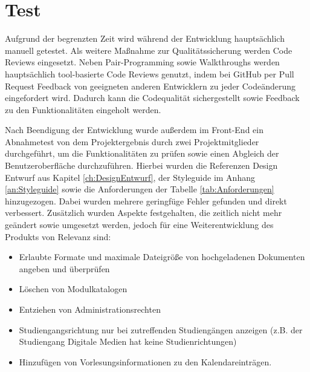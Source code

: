 \section{Test}
Aufgrund der begrenzten Zeit wird während der Entwicklung hauptsächlich manuell getestet. 
Als weitere Maßnahme zur Qualitätssicherung werden Code Reviews eingesetzt.
Neben Pair-Programming sowie Walkthroughs werden hauptsächlich tool-basierte Code Reviews genutzt, indem bei GitHub per Pull Request Feedback von geeigneten anderen Entwicklern zu jeder Codeänderung eingefordert wird.
Dadurch kann die Codequalität sichergestellt sowie Feedback zu den Funktionalitäten eingeholt werden.

Nach Beendigung der Entwicklung wurde außerdem im Front-End ein Abnahmetest von dem Projektergebnis durch zwei Projektmitglieder durchgeführt, um die Funktionalitäten zu prüfen sowie einen Abgleich der Benutzeroberfläche durchzuführen. 
Hierbei wurden die Referenzen Design Entwurf aus Kapitel \vref{ch:DesignEntwurf}, der Styleguide im Anhang \vref{an:Styleguide} sowie die Anforderungen der Tabelle \vref{tab:Anforderungen} hinzugezogen.
Dabei wurden mehrere geringfüge Fehler gefunden und direkt verbessert.
Zusätzlich wurden Aspekte festgehalten, die zeitlich nicht mehr geändert sowie umgesetzt werden, jedoch für eine Weiterentwicklung des Produkts von Relevanz sind: 

\begin{itemize}
    \item Erlaubte Formate und maximale Dateigröße von hochgeladenen Dokumenten angeben und überprüfen
    \item Löschen von Modulkatalogen 
    \item Entziehen von Administrationsrechten
    \item Studiengangsrichtung nur bei zutreffenden Studiengängen anzeigen (z.B. der Studiengang Digitale Medien hat keine Studienrichtungen)
    \item Hinzufügen von Vorlesungsinformationen zu den Kalendareinträgen.
\end{itemize}
